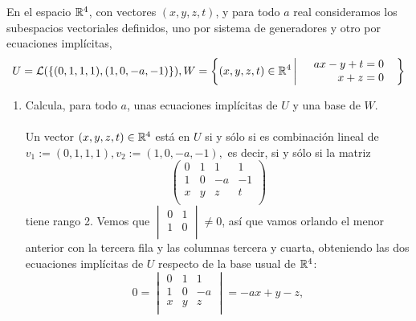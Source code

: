 \documentclass[12pt]{article}
\begin{document}
    \newpage
    \setcounter{ejercicio}{0} %

\begin{ejercicio}[2.5 puntos] En el espacio ${\mathbb{R}}^4$, con vectores $(x, y, z, t)$, y para todo $a$ real consideramos los subespacios vectoriales definidos, uno por sistema de generadores y otro por ecuaciones implícitas,
    \begin{equation*}
        U = \mathcal{L}(\{(0, 1, 1, 1), (1, 0, -a, -1)\}), W=\left\{(x, y, z, t) \in {\mathbb{R}}^4 \left|\begin{array}{rr}
             & ax-y + t = 0 \\
             & x + z = 0 \\
        \end{array}  \right. \text{ } \right\}
    \end{equation*}
    \begin{enumerate}[label=(\alph*)]        \item Calcula, para todo $a$, unas ecuaciones implícitas de $U$ y una base de $W$. \\\\
    Un vector $(x, y, z, t) \in {\mathbb{R}}^4$ está en $U$ si y sólo si es combinación lineal de $v_1 := (0, 1, 1, 1), v_2 := (1, 0, -a, -1),$ es decir, si y sólo si la matriz
    \begin{equation*}
        \begin{pmatrix}
            0 & 1 & 1 & 1 \\
            1 & 0 & -a & -1 \\
            x & y & z & t \\
        \end{pmatrix}
    \end{equation*}
    tiene rango 2. Vemos que $\begin{vmatrix}
        0 & 1 \\
        1 & 0 \\
    \end{vmatrix} \neq 0$, así que vamos orlando el menor anterior con la tercera fila y las columnas tercera y cuarta, obteniendo las dos ecuaciones implícitas de $U$ respecto de la base usual de ${\mathbb{R}}^4$:
    \begin{equation*}
        0  = \begin{vmatrix}
            0 & 1 & 1 \\
            1  & 0 & -a \\
            x & y & z \\
        \end{vmatrix} = -ax  + y -z, 

\end{equation*}
\end{enumerate}
\end{ejercicio}
\end{document}
